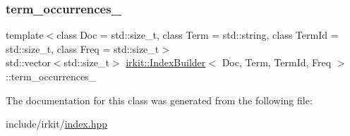 \mbox{\label{classirkit_1_1IndexBuilder_aaa27520f3a0fb37dba049d2c26ad9484}} 
\subsubsection{\texorpdfstring{term\+\_\+occurrences\+\_\+}{term\_occurrences\_}}
{\footnotesize\ttfamily template$<$class Doc  = std\+::size\+\_\+t, class Term  = std\+::string, class Term\+Id  = std\+::size\+\_\+t, class Freq  = std\+::size\+\_\+t$>$ \\
std\+::vector$<$std\+::size\+\_\+t$>$ \hyperlink{classirkit_1_1IndexBuilder}{irkit\+::\+Index\+Builder}$<$ Doc, Term, Term\+Id, Freq $>$\+::term\+\_\+occurrences\+\_\+\hspace{0.3cm}{\ttfamily [protected]}}



The documentation for this class was generated from the following file\+:\begin{DoxyCompactItemize}
\item 
include/irkit/\hyperlink{irkit_2index_8hpp}{index.\+hpp}\end{DoxyCompactItemize}
